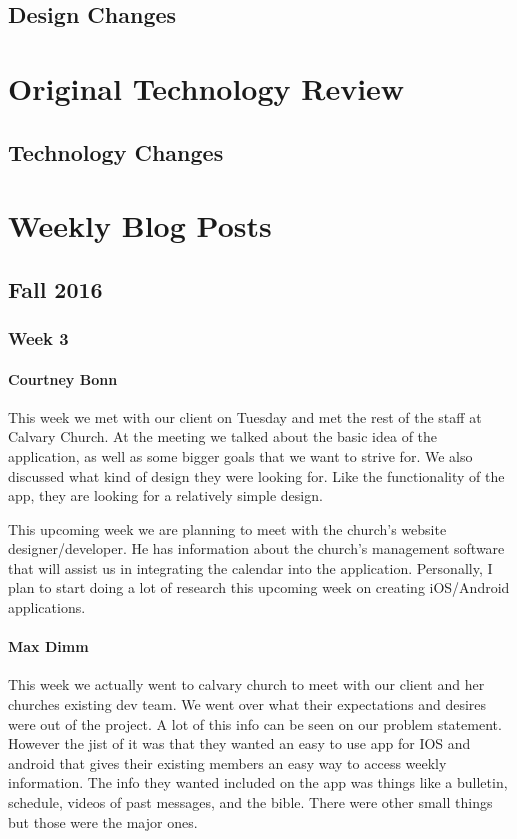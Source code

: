 \documentclass[letterpaper,10pt,draftclsnofoot,onecolumn,titlepage]{IEEEtran}
\begin{document}
	
	
	\subsection{Design Changes}
	
\section{Original Technology Review}

	

	\subsection{Technology Changes}
	
\section{Weekly Blog Posts}

	\subsection{Fall 2016}
	
		\subsubsection{Week 3}
		
			\paragraph{Courtney Bonn}
			This week we met with our client on Tuesday and met the rest of the staff at Calvary Church. At the meeting we talked about the basic idea of the application, as well as some bigger goals that we want to strive for. We also discussed what kind of design they were looking for. Like the functionality of the app, they are looking for a relatively simple design.

This upcoming week we are planning to meet with the church's website designer/developer. He has information about the church's management software that will assist us in integrating the calendar into the application. Personally, I plan to start doing a lot of research this upcoming week on creating iOS/Android applications.

			\paragraph{Max Dimm}
			This week we actually went to calvary church to meet with our client and her churches existing dev team. We went over what their expectations and desires were out of the project. A lot of this info can be seen on our problem statement. However the jist of it was that they wanted an easy to use app for IOS and android that gives their existing members an easy way to access weekly information. The info they wanted included on the app was things like a bulletin, schedule, videos of past messages, and the bible. There were other small things but those were the major ones.
\end{document}
